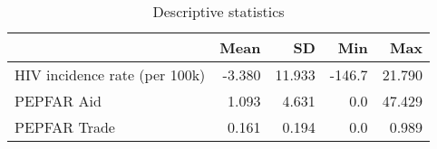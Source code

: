 \begin{table}
\centering
\caption{\label{tab:table:descriptive-main}Descriptive statistics}
\centering
\begin{tabular}[t]{lrrrr}
\toprule
 & Mean & SD & Min & Max\\
\midrule
HIV incidence rate (per 100k) & -3.380 & 11.933 & -146.7 & 21.790\\
PEPFAR Aid & 1.093 & 4.631 & 0.0 & 47.429\\
PEPFAR Trade & 0.161 & 0.194 & 0.0 & 0.989\\
\bottomrule
\end{tabular}
\end{table}
